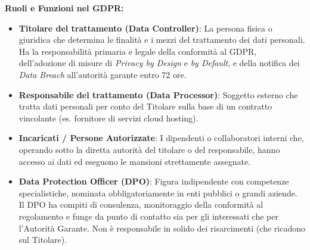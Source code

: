 \documentclass[11pt,a4paper]{article}
\begin{document}
\begin{solutionbox}
\textbf{Ruoli e Funzioni nel GDPR:}
\begin{itemize}
    \item \textbf{Titolare del trattamento (Data Controller)}: La persona fisica o giuridica che determina le finalit\`a e i mezzi del trattamento dei dati personali. Ha la responsabilit\`a primaria e legale della conformit\`a al GDPR, dell'adozione di misure di \textit{Privacy by Design} e \textit{by Default}, e della notifica dei \textit{Data Breach} all'autorit\`a garante entro 72 ore.
    \item \textbf{Responsabile del trattamento (Data Processor)}: Soggetto esterno che tratta dati personali per conto del Titolare sulla base di un contratto vincolante (es. fornitore di servizi cloud hosting).
    \item \textbf{Incaricati / Persone Autorizzate}: I dipendenti o collaboratori interni che, operando sotto la diretta autorit\`a del titolare o del responsabile, hanno accesso ai dati ed eseguono le mansioni strettamente assegnate.
    \item \textbf{Data Protection Officer (DPO)}: Figura indipendente con competenze specialistiche, nominata obbligatoriamente in enti pubblici o grandi aziende. Il DPO ha compiti di consulenza, monitoraggio della conformit\`a al regolamento e funge da punto di contatto sia per gli interessati che per l'Autorit\`a Garante. Non \`e responsabile in solido dei risarcimenti (che ricadono sul Titolare).
\end{itemize}
\end{solutionbox}
\end{document}
